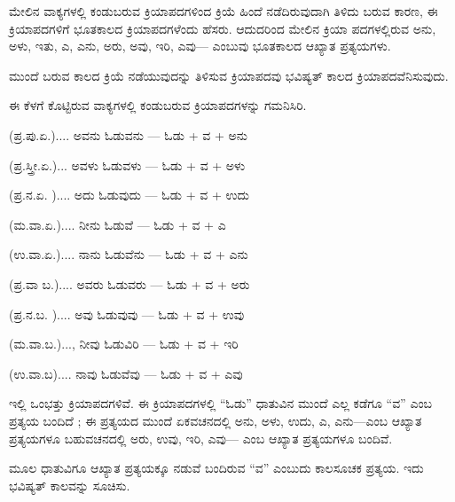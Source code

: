 \indent ಮೇಲಿನ ವಾಕ್ಯಗಳಲ್ಲಿ ಕಂಡುಬರುವ ಕ್ರಿಯಾಪದಗಳಿಂದ ಕ್ರಿಯೆ ಹಿಂದೆ ನಡೆದಿರುವುದಾಗಿ ತಿಳಿದು ಬರುವ ಕಾರಣ, ಈ ಕ್ರಿಯಾಪದಗಳಿಗೆ ಭೂತಕಾಲದ ಕ್ರಿಯಾಪದಗಳೆಂದು ಹೆಸರು. ಆದುದರಿಂದ ಮೇಲಿನ ಕ್ರಿಯಾ ಪದಗಳಲ್ಲಿರುವ ಅನು, ಅಳು, ಇತು, ಎ, ಎನು, ಅರು, ಅವು, ಇರಿ, ಎವು— ಎಂಬುವು ಭೂತಕಾಲದ ಆಖ್ಯಾತ ಪ್ರತ್ಯಯಗಳು.\par

\vspace{4pt plus 4pt minus 1pt}\hspace{0.5em}ಮುಂದೆ ಬರುವ ಕಾಲದ ಕ್ರಿಯೆ ನಡೆಯುವುದನ್ನು ತಿಳಿಸುವ ಕ್ರಿಯಾಪದವು ಭವಿಷ್ಯತ್‌ ಕಾಲದ ಕ್ರಿಯಾಪದವೆನಿಸುವುದು.\par

\indent ಈ ಕೆಳಗೆ ಕೊಟ್ಟಿರುವ ವಾಕ್ಯಗಳಲ್ಲಿ ಕಂಡುಬರುವ ಕ್ರಿಯಾಪದಗಳನ್ನು ಗಮನಿಸಿರಿ.\par

\indent (ಪ್ರ.ಪು.ಏ.).... ಅವನು ಓಡುವನು — ಓಡು + ವ + ಅನು\par

\indent (ಪ್ರ.ಸ್ತ್ರೀ.ಏ.)... ಅವಳು ಓಡುವಳು — ಓಡು + ವ + ಅಳು\par

\indent (ಪ್ರ.ನ.ಏ. ).... ಅದು ಓಡುವುದು — ಓಡು + ವ + ಉದು\par

\indent (ಮ.ವಾ.ಏ.).... ನೀನು ಓಡುವೆ — ಓಡು + ವ + ಎ\par

\indent (ಉ.ವಾ.ಏ.).... ನಾನು ಓಡುವೆನು — ಓಡು + ವ + ಎನು\par

\indent (ಪ್ರ.ವಾ ಬ.).... ಅವರು ಓಡುವರು — ಓಡು + ವ + ಅರು\par

\indent (ಪ್ರ.ನ.ಬ. ).... ಅವು ಓಡುವುವು — ಓಡು + ವ + ಉವು\par

\indent (ಮ.ವಾ.ಬ.)..., ನೀವು ಓಡುವಿರಿ — ಓಡು + ವ + ಇರಿ\par

\indent (ಉ.ವಾ.ಬ).... ನಾವು ಓಡುವೆವು — ಓಡು + ವ + ಎವು\par

\indent ಇಲ್ಲಿ ಒಂಭತ್ತು ಕ್ರಿಯಾಪದಗಳಿವೆ. ಈ ಕ್ರಿಯಾಪದಗಳಲ್ಲಿ “ಓಡು” ಧಾತುವಿನ ಮುಂದೆ ಎಲ್ಲ ಕಡೆಗೂ “ವ” ಎಂಬ ಪ್ರತ್ಯಯ ಬಂದಿದೆ ; ಈ ಪ್ರತ್ಯಯದ ಮುಂದೆ ಏಕವಚನದಲ್ಲಿ ಅನು, ಅಳು, ಉದು, ಎ, ಎನು—ಎಂಬ ಆಖ್ಯಾತ ಪ್ರತ್ಯಯಗಳೂ ಬಹುವಚನದಲ್ಲಿ ಅರು, ಉವು, ಇರಿ, ಎವು— ಎಂಬ ಆಖ್ಯಾತ ಪ್ರತ್ಯಯಗಳೂ ಬಂದಿವೆ.\par

\indent ಮೂಲ ಧಾತುವಿಗೂ ಆಖ್ಯಾತ ಪ್ರತ್ಯಯಕ್ಕೂ ನಡುವೆ ಬಂದಿರುವ “ವ” ಎಂಬುದು ಕಾಲಸೂಚಕ ಪ್ರತ್ಯಯ. ಇದು ಭವಿಷ್ಯತ್‌ ಕಾಲವನ್ನು ಸೂಚಿಸು.\par
